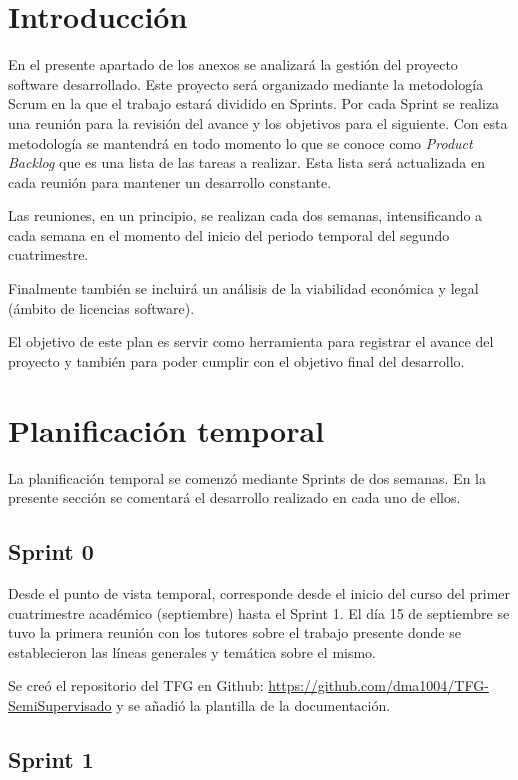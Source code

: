 
\section{Introducción}

En el presente apartado de los anexos se analizará la gestión del proyecto
software desarrollado. Este proyecto será organizado mediante la metodología
Scrum en la que el trabajo estará dividido en Sprints. Por cada Sprint se
realiza una reunión para la revisión del avance y los objetivos para el
siguiente.  Con esta metodología se mantendrá en todo momento lo que se conoce
como \textit{Product Backlog} que es una lista de las tareas a realizar. Esta
lista será actualizada en cada reunión para mantener un desarrollo constante.

Las reuniones, en un principio, se realizan cada dos semanas, intensificando a
cada semana en el momento del inicio del periodo temporal del segundo
cuatrimestre.

Finalmente también se incluirá un análisis de la viabilidad económica y legal
(ámbito de licencias software).

El objetivo de este plan es servir como herramienta para registrar el avance del
proyecto y también para poder cumplir con el objetivo final del desarrollo.

\section{Planificación temporal}
La planificación temporal se comenzó mediante Sprints de dos semanas. En la
presente sección se comentará el desarrollo realizado en cada uno de ellos.

\subsection{Sprint 0}

Desde el punto de vista temporal, corresponde desde el inicio del curso del
primer cuatrimestre académico (septiembre) hasta el Sprint 1. El día 15 de
septiembre se tuvo la primera reunión con los tutores sobre el trabajo presente
donde se establecieron las líneas generales y temática sobre el mismo.

Se creó el repositorio del TFG en Github:
\url{https://github.com/dma1004/TFG-SemiSupervisado} y se añadió la plantilla de
la documentación.

\subsection{Sprint 1}

